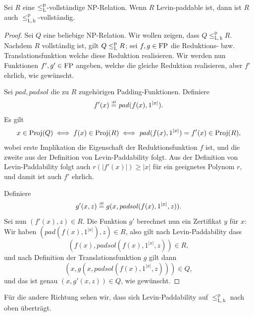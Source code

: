 \begin{lemma}
    Sei $R$ eine $\leq_\mathrm{L}^\mathrm{p}$-vollständige NP-Relation. Wenn $R$ Levin-paddable ist, dann ist 
    $R$ auch $\leq_\mathrm{L,h}^\mathrm p$-vollständig.
\end{lemma}
\begin{proof}
    Sei $Q$ eine beliebige NP-Relation. Wir wollen zeigen, dass $Q\leq_\mathrm{L,h}^\mathrm p R$.
    Nachdem $R$ vollständig ist, gilt $Q\leq_\mathrm{L}^\mathrm{p} R$; sei $f,g\in\mathrm{FP}$ die Reduktions- bzw. Translationsfunktion welche diese Reduktion realisieren. Wir werden nun Funktionen $f', g'\in\mathrm{FP}$ angeben, welche die gleiche Reduktion realisieren, aber $f'$ ehrlich, wie gewünscht.

    Sei $\mathit{pad}, \mathit{padsol}$ die zu $R$ zugehörigen Padding-Funktionen. Definiere
    \[ f'(x) \stackrel{\text{\smash{\normalfont\tiny df}}}{=}  \mathit{pad}(f(x), 1^{|x|}). \]
    Es gilt
    \[ x\in\operatorname{Proj}(Q) \iff f(x)\in \operatorname{Proj}(R) \iff \mathit{pad}(f(x), 1^{|x|})=f'(x)\in\operatorname{Proj}(R), \]
    wobei erste Implikation die Eigenschaft der Reduktionsfunktion $f$ ist, und die zweite aus der Definition von Levin-Paddability folgt.
    Aus der Definition von  Levin-Paddability folgt auch $r(|f'(x)|)\geq |x|$ für ein geeignetes Polynom $r$, und damit ist auch $f'$ ehrlich.

    Definiere
    \[ g'(x, z) \stackrel{\text{\smash{\normalfont\tiny df}}}{=}  g(x, \mathit{padsol}(f(x), 1^{|x|}, z)). \]
    Sei nun $(f'(x), z)\in R$. Die Funktion $g'$ berechnet nun ein Zertifikat $y$ für $x$: Wir haben $(\mathit{pad}(f(x), 1^{|x|}), z)\in R$, also gilt nach Levin-Paddability dass \[(f(x), \mathit{padsol}(f(x), 1^{|x|}, z))\in R,\] 
    und nach Definition der Translationsfunktion $g$ gilt dann
    \[(x, g(x, \mathit{padsol}(f(x), 1^{|x|}, z)))\in Q,\]
    und das ist genau $(x, g'(x, z))\in Q$, wie gewünscht.
\end{proof}

Für die andere Richtung sehen wir, dass sich Levin-Paddability auf $\leq_\mathrm{L,h}^\mathrm p$ nach oben überträgt. 

